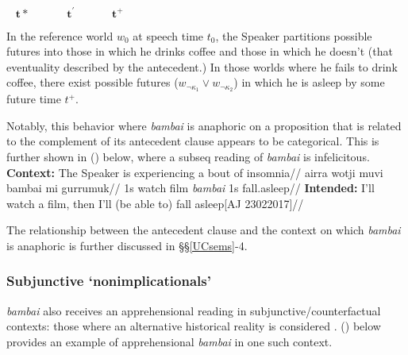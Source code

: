 \documentclass[11pt]{article}
\begin{document}
$\boldsymbol{\hspace{10pt}t*\hspace{40pt}  t^\prime \hspace{40pt}  t^+ }$\vspace{.3cm}

\leavevmode\vadjust{\vspace{-\baselineskip}}\newline{}

In the reference world $w_0$ at speech time $t_0$, the Speaker partitions possible futures into those in which he drinks coffee and those in which he doesn't (that eventuality described by the antecedent.) In those worlds where he fails to drink coffee, there exist possible futures ($w_{\neg\kappa_1}\vee w_{\neg\kappa_2}$) in which he is asleep by some future time $t^+$.
\xe

Notably, this behavior where \textit{bambai} is anaphoric on a proposition that is related to the complement of its antecedent clause appears to be categorical. This is further shown in (\nextx) below, where a {\sc subseq} reading of \textit{bambai} is infelicitous.
\pex
\begingl\glpreamble\textbf{Context:} The Speaker is experiencing a bout of insomnia//
\gla\ljudge{$^\#$}airra wotji muvi bambai mi gurrumuk//
\glb 1s watch film \textit{bambai} 1s fall.asleep//
\glft \textbf{Intended:} I'll watch a film, then I'll (be able to) fall asleep\hfill[AJ 23022017]//
\endgl\xe

The relationship between the antecedent clause and the context on which \textit{bambai} is anaphoric is further discussed in §§\ref{UCsems}-4.
\subsubsection{Subjunctive `nonimplicationals'}

\textit{bambai} also receives an apprehensional reading in subjunctive/counterfactual contexts: those where an alternative historical reality is considered \citep[see][]{VonFintel2012}. (\nextx) below provides an example of apprehensional \textit{bambai} in one such context.
\end{document}
